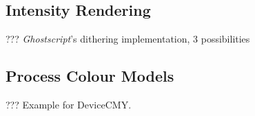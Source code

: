 \documentclass[twoside,a4paper]{article}
\newcommand{\Gs}{\textit{Ghostscript\/}}
\begin{document}

\subsection{Intensity Rendering}

??? \Gs's dithering implementation, 3 possibilities


\subsection{Process Colour Models}

??? Example for DeviceCMY.

\fi	%


\nobreak


\end{document}

